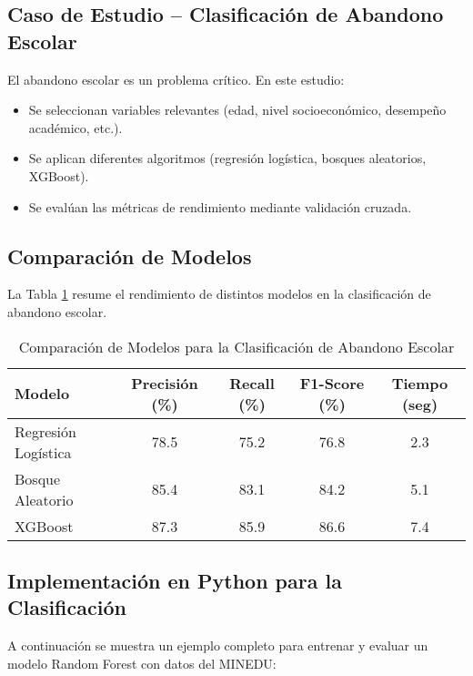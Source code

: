 \documentclass[12pt]{article}
\begin{document}
	\subsection{Caso de Estudio – Clasificación de Abandono Escolar}
	El abandono escolar es un problema crítico. En este estudio:
	\begin{itemize}[leftmargin=1.5cm]
		\item Se seleccionan variables relevantes (edad, nivel socioeconómico, desempeño académico, etc.).
		\item Se aplican diferentes algoritmos (regresión logística, bosques aleatorios, XGBoost).
		\item Se evalúan las métricas de rendimiento mediante validación cruzada.
	\end{itemize}
	\lipsum[22]
	
	\subsection{Comparación de Modelos}
	La Tabla \ref{tab:comparacion_modelos} resume el rendimiento de distintos modelos en la clasificación de abandono escolar.
	
	\begin{table}[H]
		\centering
		\caption{Comparación de Modelos para la Clasificación de Abandono Escolar}
		\begin{tabular}{|l|c|c|c|c|}
			\hline
			\textbf{Modelo} & \textbf{Precisión (\%)} & \textbf{Recall (\%)} & \textbf{F1-Score (\%)} & \textbf{Tiempo (seg)} \\
			\hline
			Regresión Logística & 78.5 & 75.2 & 76.8 & 2.3 \\
			Bosque Aleatorio & 85.4 & 83.1 & 84.2 & 5.1 \\
			XGBoost & 87.3 & 85.9 & 86.6 & 7.4 \\
			\hline
		\end{tabular}
		\label{tab:comparacion_modelos}
	\end{table}
	\lipsum[23]
	
	\subsection{Implementación en Python para la Clasificación}
	A continuación se muestra un ejemplo completo para entrenar y evaluar un modelo Random Forest con datos del MINEDU:
	
\end{document}
